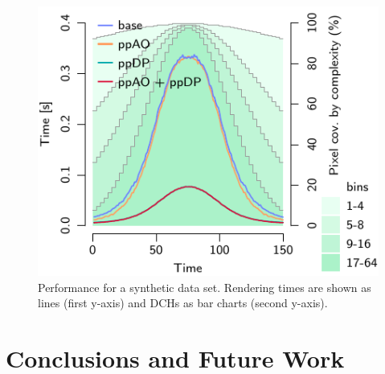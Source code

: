 \documentclass{egpubl}
\newcommand{\todo}[1]{{\color{red}\emph{(#1)}}}
\newcommand{\dch}{DCH}
\begin{document}
\begin{figure}[t]
\begin{minipage}{0.9\linewidth}
\begin{minipage}{1.0\linewidth}
    \includegraphics[width=\linewidth]{figures/plot-viewdep-quad-tall} 
  \end{minipage}
  \end{minipage}
  \caption{\label{fig:viewdep-quad}%
    Performance for a synthetic data set.
    Rendering times are shown as lines (first y-axis) and \dch{}s as bar charts (second y-axis). 
  }
\end{figure}


\section{Conclusions and Future Work}
\label{sec:conclusion}

%
\end{document}
